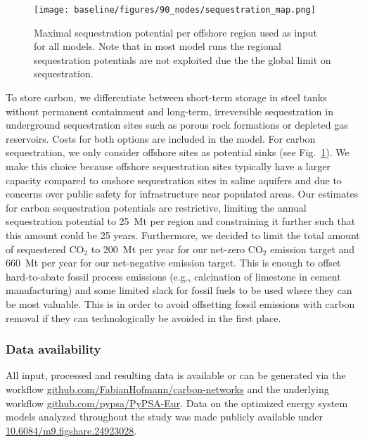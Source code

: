 \documentclass[twocolumn]{article}
\newcommand{\carbon}{CO$_2$}
\begin{document}

\begin{figure}[h!]
    \centering
    \texttt{[image: baseline/figures/90\_nodes/sequestration\_map.png]}
    \caption{Maximal sequestration potential per offshore region used as input for all models. Note that in most model runs the regional sequestration potentials are not exploited due the the global limit on sequestration.}
    \label{fig:sequestration_map}
\end{figure}

To store carbon, we differentiate between short-term storage in steel tanks without permanent containment and long-term, irreversible sequestration in underground sequestration sites such as porous rock formations or depleted gas reservoirs.
Costs for both options are included in the model.
For carbon sequestration, we only consider offshore sites as potential sinks (see Fig.~\ref{fig:sequestration_map}).
We make this choice because offshore sequestration sites typically have a larger capacity compared to onshore sequestration sites in saline aquifers and due to concerns over public safety for infrastructure near populated areas.
Our estimates for carbon sequestration potentials are restrictive, limiting the annual sequestration potential to 25~Mt per region and constraining it further such that this amount could be  25 years.
Furthermore, we decided to limit the total amount of sequestered \carbon{} to 200~Mt per year for our net-zero \carbon{} emission target and 660~Mt per year for our net-negative emission target.
This is enough to offset hard-to-abate fossil process emissions (e.g., calcination of limestone in cement manufacturing) and some limited slack for fossil fuels to be used where they can be most valuable.
This is in order to avoid offsetting fossil emissions with carbon removal if they can technologically be avoided in the first place.


\subsubsection*{Data availability}

All input, processed and resulting data is available or can be generated via the workflow \href{https://github.com/FabianHofmann/carbon-networks}{github.com/FabianHofmann/carbon-networks} and the underlying workflow \href{https://github.com/PyPSA/pypsa-eur}{github.com/pypsa/PyPSA-Eur}. Data on the optimized energy system models analyzed throughout the study was made publicly available under \href{https://doi.org/10.6084/m9.figshare.24923028}{10.6084/m9.figshare.24923028}.
\end{document}

